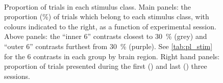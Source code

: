\begin{figure}[htbp]%
    \centering
    \hspace*{\fill}
    \hspace*{\fill}\hspace{.2cm}\hspace*{\fill}
    \hspace*{\fill}
    \\
    \hspace*{\fill}
    \hspace*{\fill}\hspace{.2cm}\hspace*{\fill}
    \hspace*{\fill}
    \caption{Proportion of trials in each stimulus class.
Main panels: the proportion (\%) of trials which belong to each stimulus class, with colours indicated to the right, as a function of experimental session.
Above panels: the ``inner \num{6}'' contrasts closest to \SI{30}{\percent} (grey) and ``outer \num{6}'' contrasts furthest from \SI{30}{\percent} (purple).
See \autoref{tab:pl_stim} for the \num{6} contrasts in each group by brain region.
Right hand panels: proportion of trials presented during the first () and last () three sessions.
}
    \label{fig:class_balance}
\end{figure}



